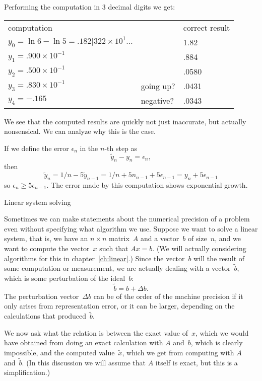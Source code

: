 Performing the computation in 3 decimal digits we get:

\begin{tabular}{lll}
  computation&&correct result\\
  $y_0=\ln 6 - \ln 5=.182|322\times 10^{1}\ldots$&&1.82\\
  $y_1=.900\times 10^{-1}$&&.884\\
  $y_2=.500\times 10^{-1}$&&.0580\\
  $y_3=.830\times 10^{-1}$&going up?&.0431\\
  $y_4=-.165$&negative?&.0343
\end{tabular}

We see that the computed results are quickly not just inaccurate, but
actually nonsensical. We can analyze why this is the case.

If we define the error $\epsilon_n$ in the $n$-th step as
\begin{equation}
  \tilde y_n-y_n=\epsilon_n,
\end{equation}then
\begin{equation}
  \tilde y_n=1/n-5\tilde y_{n-1}=1/n+5n_{n-1}+5\epsilon_{n-1}
  = y_n+5\epsilon_{n-1}
\end{equation}
so $\epsilon_n\geq 5\epsilon_{n-1}$. The error made by this
computation shows exponential growth.

 {Linear system solving}

Sometimes we can make statements about the numerical precision of a
problem even without specifying what algorithm we use. Suppose we want
to solve a linear system, that is, we have an $n\times n$ matrix~$A$
and a vector~$b$ of size~$n$, and we want to compute the vector~$x$
such that $Ax=b$. (We will actually considering algorithms for this in
chapter~\ref{ch:linear}.) Since the vector~$b$ will the result of some
computation or measurement, we are actually dealing with a
vector~$\tilde b$, which is some perturbation of the ideal~$b$:
\begin{equation}
  \tilde b =  b+\Delta b.
\end{equation}
The perturbation vector~$\Delta b$ can be of the order of the machine
precision if it only arises from representation error, or it can be
larger, depending on the calculations that produced~$\tilde b$.

We now ask what the relation is between the exact value of~$x$, which
we would have obtained from doing an exact calculation with $A$
and~$b$, which is clearly impossible, and
the computed value~$\tilde x$, which we get from computing with $A$
and~$\tilde b$. (In this discussion we will assume that $A$ itself is
exact, but this is a simplification.)

